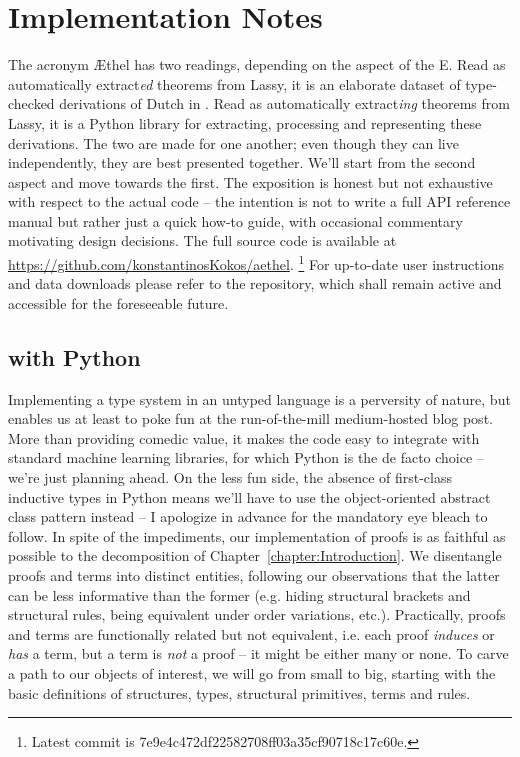 \chapter{Implementation Notes}
\label{appendix:implementation_notes}

The acronym \AE thel has two readings, depending on the aspect of the E.
Read as automatically extract\textit{ed} theorems from Lassy, it is an elaborate dataset of type-checked derivations of Dutch in \LPplus{}.
Read as automatically extract\textit{ing} theorems from Lassy, it is a Python library for extracting, processing and representing these derivations.
The two are made for one another; even though they can live independently, they are best presented together.
We'll start from the second aspect and move towards the first.
The exposition is honest but not exhaustive with respect to the actual code -- the intention is not to write a full API reference manual but rather just a quick how-to guide, with occasional commentary motivating design decisions.
The full source code is available at \url{https://github.com/konstantinosKokos/aethel}.%
	\footnote{Latest commit is 7e9e4c472df22582708ff03a35cf90718c17c60e.}
For up-to-date user instructions and data downloads please refer to the repository, which shall remain active and accessible for the foreseeable future.

\section{\LPplus{} with Python}
\label{subappendix:nlp}
Implementing a type system in an untyped language is a perversity of nature, but enables us at least to poke fun at the run-of-the-mill medium-hosted blog post.
More than providing comedic value, it makes the code easy to integrate with standard machine learning libraries, for which Python is the de facto choice -- we're just planning ahead.
On the less fun side, the absence of first-class inductive types in Python means we'll have to use the object-oriented  abstract class pattern instead -- I apologize in advance for the mandatory eye bleach to follow.
In spite of the impediments, our implementation of \LPplus{} proofs is as faithful as possible to the decomposition of Chapter~\ref{chapter:Introduction}.
We disentangle proofs and terms into distinct entities, following our observations that the latter can be less informative than the former (e.g. hiding structural brackets and structural rules, being equivalent under order variations, etc.).
Practically, proofs and terms are functionally related but not equivalent, i.e. each proof \textit{induces} or \textit{has} a term, but a term is \textit{not} a proof -- it might be either many or none.
To carve a path to our objects of interest, we will go from small to big, starting with the basic definitions of structures, types, structural primitives, terms and rules.


